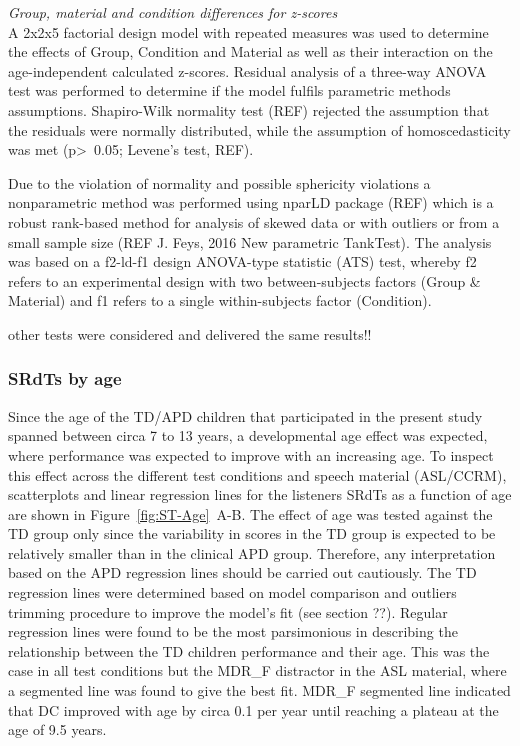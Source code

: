 \documentclass[a4paper, twoside]{templates/ociamthesis}
\begin{document}
\colorbox[HTML]{CCCCFF}{\emph{Group, material and condition differences for z-scores}}\\
A 2x2x5 factorial design model with repeated measures was used to determine the effects of Group, Condition and Material as well as their interaction on the age-independent calculated z-scores. Residual analysis of a three-way ANOVA test was performed to determine if the model fulfils parametric methods assumptions. Shapiro-Wilk normality test (REF) rejected the assumption that the residuals were normally distributed, while the assumption of homoscedasticity was met (p\textgreater~0.05; Levene's test, REF).

Due to the violation of normality and possible sphericity violations a nonparametric method was performed using nparLD package (REF) which is a robust rank-based method for analysis of skewed data or with outliers or from a small sample size (REF J. Feys, 2016 New parametric TankTest). The analysis was based on a f2-ld-f1 design ANOVA-type statistic (ATS) test, whereby f2 refers to an experimental design with two between-subjects factors (Group \& Material) and f1 refers to a single within-subjects factor (Condition).

other tests were considered and delivered the same results!!

\hypertarget{srdts-by-age}{%
\subsubsection*{SRdTs by age}\label{srdts-by-age}}

Since the age of the TD/APD children that participated in the present study spanned between circa 7 to 13 years, a developmental age effect was expected, where performance was expected to improve with an increasing age. To inspect this effect across the different test conditions and speech material (ASL/CCRM), scatterplots and linear regression lines for the listeners SRdTs as a function of age are shown in Figure~\ref{fig:ST-Age}~A-B. The effect of age was tested against the TD group only since the variability in scores in the TD group is expected to be relatively smaller than in the clinical APD group. Therefore, any interpretation based on the APD regression lines should be carried out cautiously. The TD regression lines were determined based on model comparison and outliers trimming procedure to improve the model's fit (see section ??). Regular regression lines were found to be the most parsimonious in describing the relationship between the TD children performance and their age. This was the case in all test conditions but the MDR\_F distractor in the ASL material, where a segmented line was found to give the best fit. MDR\_F segmented line indicated that DC improved with age by circa 0.1 per year until reaching a plateau at the age of 9.5 years.
\end{document}
